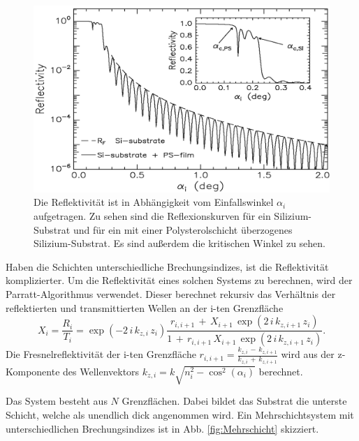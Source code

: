 \begin{figure}
    \centering
    \includegraphics[width=0.7\linewidth]{./figures/Kurve.png}
    \caption{Die Reflektivität ist in Abhängigkeit vom Einfallswinkel $\alpha_i$ aufgetragen. Zu sehen sind die Reflexionskurven für ein Silizium-Substrat und für ein mit einer Polysterolschicht überzogenes Silizium-Substrat. Es sind außerdem die kritischen Winkel zu sehen. \cite{V44old}}
    \label{fig:Kurve}
\end{figure}

Haben die Schichten unterschiedliche Brechungsindizes, ist die Reflektivität komplizierter. Um die Reflektivität eines solchen Systems zu berechnen, wird der Parratt-Algorithmus verwendet.
Dieser berechnet rekursiv das Verhältnis der reflektierten und transmittierten Wellen an der i-ten Grenzfläche
\begin{equation}
    X_i = \frac{R_i}{T_i} = \exp(-2 \, i \, k_{z,i} \, z_i) \frac{r_{i, i+1} \, + \, X_{i+1} \, \exp(2 \, i \, k_{z,i+1} \, z_i)}{1 \, + \, r_{i,i+1} \, X_{i+1} \, \exp(2 \, i \, k_{z,i+1} \, z_i)}.
    \label{eq:parratt}
\end{equation}
Die Fresnelreflektivität der i-ten Grenzfläche $r_{i, i+1} = \frac{k_{z,i} \, - \, k_{z,i+1}}{k_{z,i} \, + \, k_{z,i+1}}$ wird aus der z-Komponente des Wellenvektors $k_{z,i} = k \sqrt{n^2_i - \cos^2(\alpha_i)}$ berechnet.

Das System besteht aus $N$ Grenzflächen. Dabei bildet das Substrat die unterste Schicht, welche als unendlich dick angenommen wird.
Ein Mehrschichtsystem mit unterschiedlichen Brechungsindizes ist in Abb. \ref{fig:Mehrschicht} skizziert.

